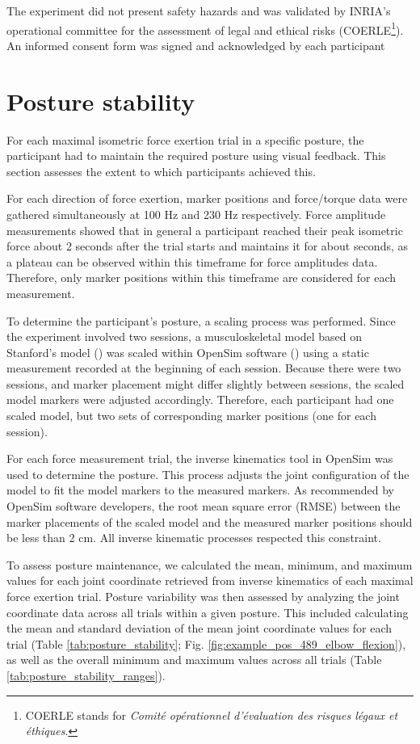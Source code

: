The experiment did not present safety hazards and was validated by INRIA's operational committee for the assessment of legal and ethical risks (COERLE\footnote{COERLE stands for \emph{Comité opérationnel d'évaluation des risques légaux et éthiques}.}). An informed consent form was signed and acknowledged by each participant

\section{Posture stability}
\label{sec:posture_stability}
For each maximal isometric force exertion trial in a specific posture, the participant had to maintain the required posture using visual feedback. This section assesses the extent to which participants achieved this.

For each direction of force exertion, marker positions and force/torque data were gathered simultaneously at 100 Hz and 230 Hz respectively. Force amplitude measurements showed that in general a participant reached their peak isometric force about 2 seconds after the trial starts and maintains it for about seconds, as a plateau can be observed within this timeframe for force amplitudes data. Therefore, only marker positions within this timeframe are considered for each measurement.

To determine the participant's posture, a scaling process was performed. Since the experiment involved two sessions, a musculoskeletal model based on Stanford's model (\cite{holzbaurModelUpperExtremity2005}) was scaled within OpenSim software (\cite{delpOpenSimOpenSourceSoftware2007}) using a static measurement recorded at the beginning of each session. Because there were two sessions, and marker placement might differ slightly between sessions, the scaled model markers were adjusted accordingly. Therefore, each participant had one scaled model, but two sets of corresponding marker positions (one for each session).

For each force measurement trial, the inverse kinematics tool in OpenSim was used to determine the posture. This process adjusts the joint configuration of the model to fit the model markers to the measured markers. As recommended by OpenSim software developers, the root mean square error (RMSE) between the marker placements of the scaled model and the measured marker positions should be less than 2 cm. All inverse kinematic processes respected this constraint.

To assess posture maintenance, we calculated the mean, minimum, and maximum values for each joint coordinate retrieved from inverse kinematics of each maximal force exertion trial. Posture variability was then assessed by analyzing the joint coordinate data across all trials within a given posture. This included calculating the mean and standard deviation of the mean joint coordinate values for each trial (Table \ref{tab:posture_stability}; Fig. \ref{fig:example_pos_489_elbow_flexion}), as well as the overall minimum and maximum values across all trials (Table \ref{tab:posture_stability_ranges}).


